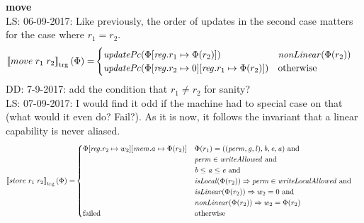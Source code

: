\documentclass[a4paper]{article}
\newcommand\lau[1]{{\color{purple} \sf \footnotesize {LS: #1}}\\}
\newcommand\dominique[1]{{\color{purple} \sf \footnotesize {DD: #1}}\\}
\newcommand{\sem}[1]{\left\llbracket #1 \right\rrbracket}
\newcommand{\tsem}[2][\Phi]{\sem{#2}_{\mathrm{trg}}(#1)}
\newcommand{\tand}{\text{ and }}
\newcommand{\totherwise}{\text{otherwise }}
\newcommand{\targetcolor}[1]{\color{black}}
\newcommand{\trg}[1]{{\targetcolor{} #1}}
\newcommand{\zinstr}[1]{#1}
\newcommand{\twoinstr}[3]{
  \ifthenelse{\equal{#2#3}{}}
  {\zinstr{#1}}
  {\zinstr{#1} \; #2 \; #3}
}
\newcommand{\tmove}[2]{\twoinstr{\trg{move}}{#1}{#2}}
\newcommand{\tstore}[2]{\twoinstr{\trg{store}}{#1}{#2}}
\newcommand{\update}[2]{[#1 \mapsto #2]}
\newcommand{\updReg}[2]{\update{\reg.#1}{#2}}
\newcommand{\perm}{\var{perm}}
\newcommand{\gl}{\var{g}}
\newcommand{\lin}{\var{l}}
\newcommand{\failed}{\mathrm{failed}}
\newcommand{\var}[1]{\mathit{#1}}
\newcommand{\reg}{\var{reg}}
\newcommand{\mem}{\var{mem}}
\newcommand{\baddr}{\var{b}}
\newcommand{\eaddr}{\var{e}}
\newcommand{\aaddr}{\var{a}}
\newcommand{\plainfun}[2]{
  \ifthenelse{\equal{#2}{}}
  {\mathit{#1}}
  {\mathit{#1}(#2)}
}
\newcommand{\updPcAddr}[1]{\plainfun{updatePc}{#1}}
\newcommand{\writeAllowed}[1]{\plainfun{writeAllowed}{#1}}
\newcommand{\writeLocalAllowed}[1]{\plainfun{writeLocalAllowed}{#1}}
\newcommand{\nonLinear}[1]{\plainfun{nonLinear}{#1}}
\newcommand{\isLoc}[1]{\plainfun{isLocal}{#1}}
\newcommand{\isLinear}[1]{\plainfun{isLinear}{#1}}
\begin{document}
\textbf{move}\\
\lau{06-09-2017: Like previously, the order of updates in the second case matters for the case where $r_1 = r_2$.}
\begin{align*}
  \tsem{\tmove{r_1}{r_2}} = & 
                              \begin{cases}
                                \updPcAddr{\Phi\updReg{r_1}{\Phi(r_2)}} & \nonLinear{\Phi(r_2)}\\
                                \updPcAddr{\Phi\updReg{r_2}{0}\updReg{r_1}{\Phi(r_2)}} & \totherwise 
                              \end{cases}
\end{align*}
\dominique{7-9-2017: add the condition that $r_1 \neq r_2$ for sanity?}
\lau{07-09-2017: I would find it odd if the machine had to special case on that (what would it even do? Fail?). As it is now, it follows the invariant that a linear capability is never aliased.}

\begin{align*}
  \tsem{\tstore{r_1}{r_2}} = & 
                               \begin{cases}
                                 \Phi\updReg{r_2}{w_2}
                                     \update{\mem.a}{\Phi(r_2)} & \arraycolsep=0pt
                                     \begin{array}[t]{l}
                                       \Phi(r_1) = ((\perm,\gl,\lin),\baddr,\eaddr,\aaddr) \tand \\
                                       \perm \in \writeAllowed{} \tand \\
                                       \baddr \leq \aaddr \leq \eaddr \tand \\
                                       \isLoc{\Phi(r_2)} \Rightarrow \perm \in \writeLocalAllowed{} \tand \\
                                       \isLinear{\Phi(r_2)} \Rightarrow w_2 = 0 \tand \\
                                       \nonLinear{\Phi(r_2)} \Rightarrow w_2 = \Phi(r_2)
                                     \end{array} \\
                                  \failed & \totherwise
                               \end{cases}
\end{align*}
\end{document}
